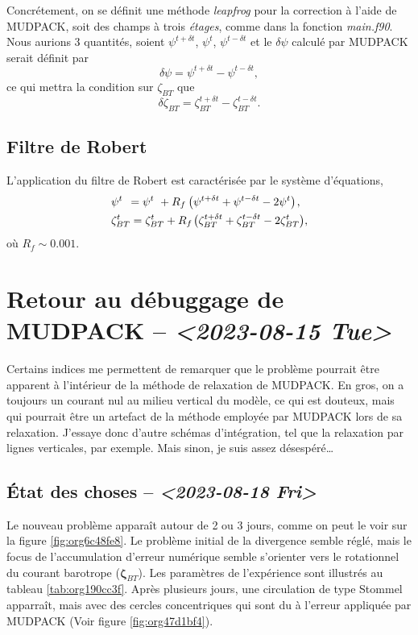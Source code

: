\documentclass[10pt]{article}
\numberwithin{equation}{section}
\newcommand{\pt}{\hspace{1pt}} %
\begin{document}
Concrétement, on se définit une méthode \emph{leapfrog} pour la correction à l'aide de MUDPACK, soit des champs à trois \emph{étages}, comme dans la fonction \emph{main.f90}.
Nous aurions 3 quantités, soient \(\psi^{t+\delta t}\), \(\psi^t\), \(\psi^{t-\delta t}\) et le \(\delta \psi\) calculé par MUDPACK serait définit par
\begin{equation}
\label{eq:org6184819}
   \delta \psi = \psi^{t+\delta t} - \psi^{t-\delta t},
\end{equation}
ce qui mettra la condition sur \(\zeta_{BT}\) que
\begin{equation}
\label{eq:org352a052}
   \delta \zeta_{BT} = \zeta_{BT}^{t+\delta t} - \zeta_{BT}^{t-\delta t}.
\end{equation}
\subsection{Filtre de Robert}
\label{sec:org1d9d52d}
\label{org0655395}
L'application du filtre de Robert est caractérisée par le système d'équations,
\begin{align}
   &\psi^t \ \pt= \psi^t \ + R_f\pt\pt \qty( \psi^{t+\delta t}  +\psi^{t-\delta t} - 2\psi^t)\pt,\\
   &\zeta_{BT}^t = \zeta_{BT}^t + R_f\pt \qty( \zeta_{BT}^{t+\delta t}  +\zeta_{BT}^{t-\delta t} - 2\zeta_{BT}^t),
\end{align}
où \(R_f \sim 0.001\).
\section{Retour au débuggage de MUDPACK -- \textit{<2023-08-15 Tue>}}
\label{sec:org385b66d}
Certains indices me permettent de remarquer que le problème pourrait être apparent à l'intérieur de la méthode de relaxation de MUDPACK.
En gros, on a toujours un courant nul au milieu vertical du modèle, ce qui est douteux, mais qui pourrait être un artefact de la méthode employée par MUDPACK lors de sa relaxation.
J'essaye donc d'autre schémas d'intégration, tel que la relaxation par lignes verticales, par exemple.
Mais sinon, je suis assez désespéré\ldots{}
\subsection{État des choses -- \textit{<2023-08-18 Fri>}}
\label{sec:org680b808}

Le nouveau problème apparaît autour de 2 ou 3 jours, comme on peut le voir sur la figure \ref{fig:org6c48fe8}.
Le problème initial de la divergence semble réglé, mais le focus de l'accumulation d'erreur numérique semble s'orienter vers le rotationnel du courant barotrope (\(\boldsymbol{\zeta}_{BT}\)).
Les paramètres de l'expérience sont illustrés au tableau \ref{tab:org190cc3f}.
Après plusieurs jours, une circulation de type Stommel apparraît, mais avec des cercles concentriques qui sont du à l'erreur appliquée par MUDPACK (Voir figure \ref{fig:org47d1bf4}).
\end{document}
